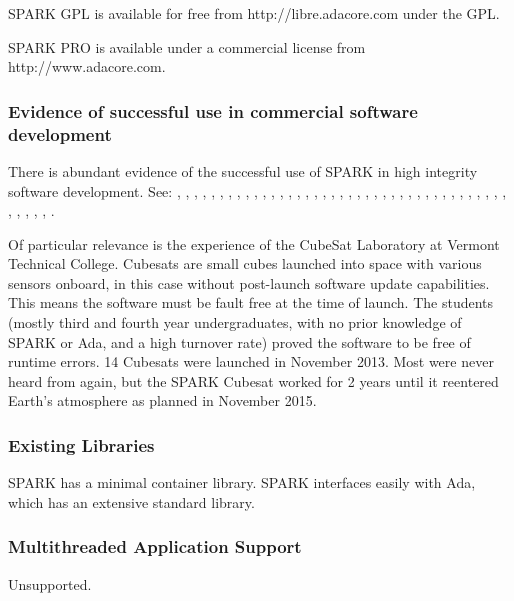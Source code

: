 \documentclass[11pt]{article}
\begin{document}
		SPARK GPL is available for free from http://libre.adacore.com under the GPL.

		SPARK PRO is available under a commercial license from http://www.adacore.com.


	\subsubsection{Evidence of successful use in commercial software development}
	There is abundant evidence of the successful use of SPARK in high integrity software development. See: \cite{spark01}, \cite{spark02}, \cite{spark03}, \cite{spark04}, \cite{spark05}, \cite{spark06}, \cite{spark07}, \cite{spark08}, \cite{spark09}, \cite{spark10}, \cite{spark11}, \cite{spark12}, \cite{spark13}, \cite{spark14}, \cite{spark15}, \cite{spark16}, \cite{spark17}, \cite{spark18}, \cite{spark19}, \cite{spark20}, \cite{spark21}, \cite{spark22}, \cite{spark23}, \cite{spark24}, \cite{spark25}, \cite{spark26}, \cite{spark27}, \cite{spark28}, \cite{spark29}, \cite{spark30}, \cite{spark31}, \cite{spark32}, \cite{spark33}, \cite{spark34}, \cite{spark35}, \cite{spark36}, \cite{spark37}, \cite{spark38}, \cite{spark39}, \cite{spark40}, \cite{spark41}, \cite{spark42}, \cite{spark43}, \cite{spark44}, \cite{spark45}.
	
	
	Of particular relevance is the experience of the CubeSat Laboratory at Vermont Technical College\cite{sparkstudents}. Cubesats are small cubes launched into space with various sensors onboard, in this case without post-launch software update capabilities. This means the software must be fault free at the time of launch. The students (mostly third and fourth year undergraduates, with no prior knowledge of SPARK or Ada, and a high turnover rate) proved the software to be free of runtime errors. 14 Cubesats were launched in November 2013. Most were never heard from again, but the SPARK Cubesat worked for 2 years until it reentered Earth's atmosphere as planned in November 2015. 

	\subsubsection{Existing Libraries}
	SPARK has a minimal container library. SPARK interfaces easily with Ada, which has an extensive standard library.

	\subsubsection{Multithreaded Application Support}
	Unsupported.
\end{document}
